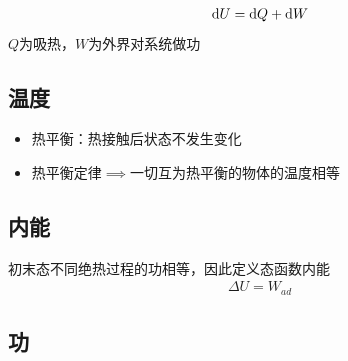 \begin{gather*}
    \mathrm{d} U = \mathrm{d} Q + \mathrm{d} W
\end{gather*}
$Q$为吸热，$W$为外界对系统做功

\subsection{温度}

\begin{itemize}
    \item 热平衡：热接触后状态不发生变化
    \item 热平衡定律$\implies$一切互为热平衡的物体的温度相等
\end{itemize}

\subsection{内能}

初末态不同绝热过程的功相等，因此定义态函数内能
\begin{gather*}
    \Delta U = W_{ad}
\end{gather*}

\subsection{功}

